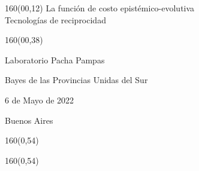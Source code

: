 \documentclass[shownotes,aspectratio=169]{beamer}
\begin{document}
\begin{frame}
\begin{textblock}{160}(00,12)
\centering
\huge La función de costo epistémico-evolutiva \\ \LARGE Tecnologías de reciprocidad
\end{textblock}

\begin{textblock}{160}(00,38) \centering

Laboratorio Pacha Pampas

Bayes de las Provincias Unidas del Sur

\vspace{2.33cm}

6 de Mayo de 2022

\vspace{.3cm}

Buenos Aires
\end{textblock}


\begin{textblock}{160}(0,54) \centering
\textcolor{black!75}{}
\end{textblock}
\begin{textblock}{160}(0,54) \centering
\textcolor{black!75}{}
\end{textblock}


\end{frame}
\end{document}
